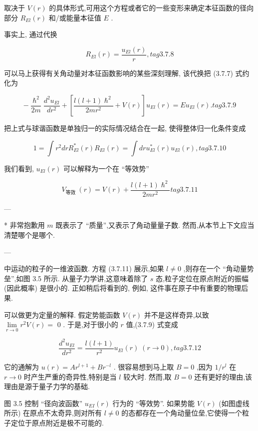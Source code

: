 取决于 $V\left( r\right)$ 的具体形式,可用这个方程或者它的一些变形来确定本征函数的径向部分 ${R}_{El}\left( r\right)$ 和/或能量本征值 $E$ .

事实上, 通过代换

$$
{R}_{El}\left( r\right) = \frac{{u}_{El}\left( r\right) }{r}, tag{3.7.8}
$$

可以马上获得有关角动量对本征函数影响的某些深刻理解, 该代换把 (3.7.7) 式约化为

$$
- \frac{{\hslash }^{2}}{2m}\frac{{d}^{2}{u}_{El}}{d{r}^{2}} + \left\lbrack {\frac{l\left( {l + 1}\right) {\hslash }^{2}}{{2m}{r}^{2}} + V\left( r\right) }\right\rbrack {u}_{El}\left( r\right) = E{u}_{El}\left( r\right) . tag{3.7.9}
$$

把上式与球谐函数是单独归一的实际情况结合在一起, 使得整体归一化条件变成

$$
1 = \int {r}^{2}{dr}{R}_{El}^{ * }\left( r\right) {R}_{El}\left( r\right) = \int {dr}{u}_{El}^{ * }\left( r\right) {u}_{El}\left( r\right) , tag{3.7.10}
$$

我们看到, ${u}_{El}\left( r\right)$ 可以解释为一个在 “等效势”

$$
{V}_{\text{等效 }}\left( r\right) = V\left( r\right) + \frac{l\left( {l + 1}\right) {\hslash }^{2}}{{2m}{r}^{2}} tag{3. 7.11}
$$

---

* 非常抱歉用 $m$ 既表示了 “质量”,又表示了角动量量子数. 然而,从本节上下文应当清楚哪个是哪个.

---

中运动的粒子的一维波函数. 方程 (3.7.11) 展示,如果 $l \neq 0$ ,则存在一个 “角动量势垒”,如图 3.5 所示. 从量子力学讲,这意味着除了 $s$ 态,粒子定位在原点附近的振幅 (因此概率) 是很小的. 正如稍后将看到的, 例如, 这件事在原子中有重要的物理后果.

可以做更为定量的解释. 假定势能函数 $V\left( r\right)$ 并不是这样奇异,以致 $\mathop{\lim }\limits_{{r \rightarrow 0}}{r}^{2}V\left( r\right) =$ 0 . 于是,对于很小的 $r$ 值,(3.7.9) 式变成

$$
\frac{{d}^{2}{u}_{El}}{d{r}^{2}} = \frac{l\left( {l + 1}\right) }{{r}^{2}}{u}_{El}\left( r\right) \;\left( {r \rightarrow 0}\right) , tag{3. 7.12}
$$

它的通解为 $u\left( r\right) = A{r}^{l + 1} + B{r}^{-l}$ . 很容易想到马上取 $B = 0$ ,因为 $1/{r}^{l}$ 在 $r \rightarrow 0$ 时产生严重的奇异性,特别是当 $l$ 较大时. 然而,取 $B = 0$ 还有更好的理由,该理由是源于量子力学的基础.


图 3.5 控制 “径向波函数” ${u}_{EI}\left( r\right)$ 行为的 “等效势”. 如果势能 $V\left( r\right)$ (如图虚线所示) 在原点不太奇异,则对所有 $l \neq 0$ 的态都存在一个角动量位垒,它使得一个粒子定位于原点附近是极不可能的.

